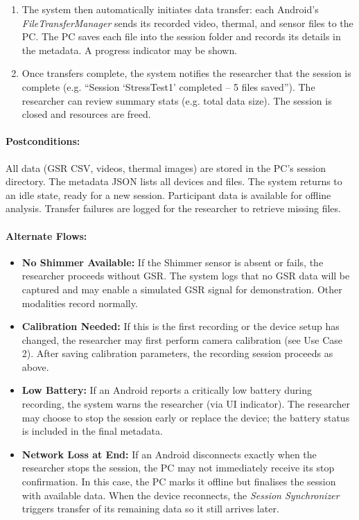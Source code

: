 \begin{enumerate}
	\item The system then automatically initiates data transfer: each Android’s \textit{FileTransferManager} sends its recorded video, thermal, and sensor files to the PC. The PC saves each file into the session folder and records its details in the metadata. A progress indicator may be shown.
	\item Once transfers complete, the system notifies the researcher that the session is complete (e.g. “Session ‘StressTest1’ completed – 5 files saved”). The researcher can review summary stats (e.g. total data size). The session is closed and resources are freed.
\end{enumerate}

\paragraph{Postconditions:} All data (GSR CSV, videos, thermal images) are stored in the PC's session directory. The metadata JSON lists all devices and files. The system returns to an idle state, ready for a new session. Participant data is available for offline analysis. Transfer failures are logged for the researcher to retrieve missing files.

\paragraph{Alternate Flows:}
\begin{itemize}
	\item \textbf{No Shimmer Available:} If the Shimmer sensor is absent or fails, the researcher proceeds without GSR. The system logs that no GSR data will be captured and may enable a simulated GSR signal for demonstration. Other modalities record normally.
	\item \textbf{Calibration Needed:} If this is the first recording or the device setup has changed, the researcher may first perform camera calibration (see Use Case 2). After saving calibration parameters, the recording session proceeds as above.
	\item \textbf{Low Battery:} If an Android reports a critically low battery during recording, the system warns the researcher (via UI indicator). The researcher may choose to stop the session early or replace the device; the battery status is included in the final metadata.
	\item \textbf{Network Loss at End:} If an Android disconnects exactly when the researcher stops the session, the PC may not immediately receive its stop confirmation. In this case, the PC marks it offline but finalises the session with available data. When the device reconnects, the \textit{Session Synchronizer} triggers transfer of its remaining data so it still arrives later.
\end{itemize}


